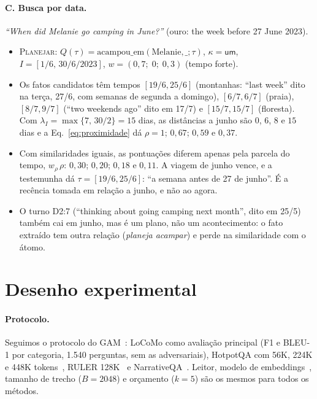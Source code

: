 \documentclass[11pt]{article}
\theoremstyle{definition}
\theoremstyle{plain}
\newcommand{\op}[1]{\textsc{#1}}
\newcommand{\um}{\textsf{um}}
\begin{document}
\paragraph{C. Busca por data.} \emph{``When did Melanie go camping in
June?''} (ouro: the week before 27 June 2023).
\begin{itemize}[leftmargin=*,itemsep=1pt]
\item \op{Planejar}: $Q(\tau)=\text{acampou\_em}(\text{Melanie},\_;\tau)$,
  $\kappa=\um$, $I=[1/6,\,30/6/2023]$, $w=(0{,}7;\;0;\;0{,}3)$ (tempo forte).
\item Os fatos candidatos têm tempos $[19/6,25/6]$ (montanhas: ``last week''
  dito na terça, 27/6, com semanas de segunda a domingo), $[6/7,6/7]$
  (praia), $[8/7,9/7]$ (``two weekends ago'' dito em 17/7) e
  $[15/7,15/7]$ (floresta). Com $\lambda_I=\max\{7,\,30/2\}=15$ dias, as
  distâncias a junho são $0$, $6$, $8$ e $15$ dias e a
  Eq.~\eqref{eq:proximidade} dá $\rho=1$; $0{,}67$; $0{,}59$ e $0{,}37$.
\item Com similaridades iguais, as pontuações diferem apenas pela parcela do
  tempo, $w_\rho\,\rho$: $0{,}30$; $0{,}20$; $0{,}18$ e $0{,}11$. A viagem de
  junho vence, e a testemunha dá $\tau=[19/6,25/6]$: ``a semana antes de 27 de
  junho''. É a recência tomada em relação a junho, e não ao agora.
\item O turno D2:7 (``thinking about going camping next month'', dito em
  25/5) também cai em junho, mas é um plano, não um acontecimento: o fato
  extraído tem outra relação (\emph{planeja acampar}) e perde na similaridade
  com o átomo.
\end{itemize}

\section{Desenho experimental}

\paragraph{Protocolo.} Seguimos o protocolo do GAM~\citep{yan2025gam}: LoCoMo
como avaliação principal (F1 e BLEU-1 por categoria, 1.540 perguntas, sem as
adversariais), HotpotQA com 56K, 224K e 448K
tokens~\citep{yang2018hotpotqa}, RULER 128K~\citep{hsieh2024ruler} e
NarrativeQA~\citep{kocisky2018narrativeqa}. Leitor, modelo de
embeddings~\citep{chen2024bgem3}, tamanho de trecho ($B=2048$) e orçamento
($k=5$) são os mesmos para todos os métodos.
\end{document}
